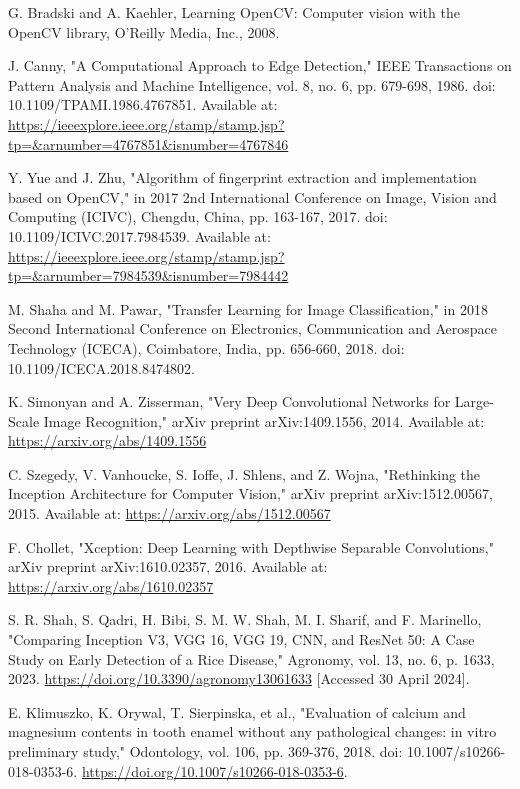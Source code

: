 \begin{thebibliography}{99}
    G. Bradski and A. Kaehler, Learning OpenCV: Computer vision with the OpenCV library, O'Reilly Media, Inc., 2008.
    
    J. Canny, "A Computational Approach to Edge Detection," IEEE Transactions on Pattern Analysis and Machine Intelligence, vol. 8, no. 6, pp. 679-698, 1986. doi: 10.1109/TPAMI.1986.4767851. Available at: \url{https://ieeexplore.ieee.org/stamp/stamp.jsp?tp=&arnumber=4767851&isnumber=4767846}
    
    Y. Yue and J. Zhu, "Algorithm of fingerprint extraction and implementation based on OpenCV," in 2017 2nd International Conference on Image, Vision and Computing (ICIVC), Chengdu, China, pp. 163-167, 2017. doi: 10.1109/ICIVC.2017.7984539. Available at: \url{https://ieeexplore.ieee.org/stamp/stamp.jsp?tp=&arnumber=7984539&isnumber=7984442}
    
    M. Shaha and M. Pawar, "Transfer Learning for Image Classification," in 2018 Second International Conference on Electronics, Communication and Aerospace Technology (ICECA), Coimbatore, India, pp. 656-660, 2018. doi: 10.1109/ICECA.2018.8474802.
    
    K. Simonyan and A. Zisserman, "Very Deep Convolutional Networks for Large-Scale Image Recognition," arXiv preprint arXiv:1409.1556, 2014. Available at: \url{https://arxiv.org/abs/1409.1556}
    
    C. Szegedy, V. Vanhoucke, S. Ioffe, J. Shlens, and Z. Wojna, "Rethinking the Inception Architecture for Computer Vision," arXiv preprint arXiv:1512.00567, 2015. Available at: \url{https://arxiv.org/abs/1512.00567}
    
    F. Chollet, "Xception: Deep Learning with Depthwise Separable Convolutions," arXiv preprint arXiv:1610.02357, 2016. Available at: \url{https://arxiv.org/abs/1610.02357}
    
    S. R. Shah, S. Qadri, H. Bibi, S. M. W. Shah, M. I. Sharif, and F. Marinello, "Comparing Inception V3, VGG 16, VGG 19, CNN, and ResNet 50: A Case Study on Early Detection of a Rice Disease," Agronomy, vol. 13, no. 6, p. 1633, 2023. \url{https://doi.org/10.3390/agronomy13061633} [Accessed 30 April 2024].
    
    E. Klimuszko, K. Orywal, T. Sierpinska, et al., "Evaluation of calcium and magnesium contents in tooth enamel without any pathological changes: in vitro preliminary study," Odontology, vol. 106, pp. 369-376, 2018. doi: 10.1007/s10266-018-0353-6. \url{https://doi.org/10.1007/s10266-018-0353-6}.
    

\end{thebibliography}
